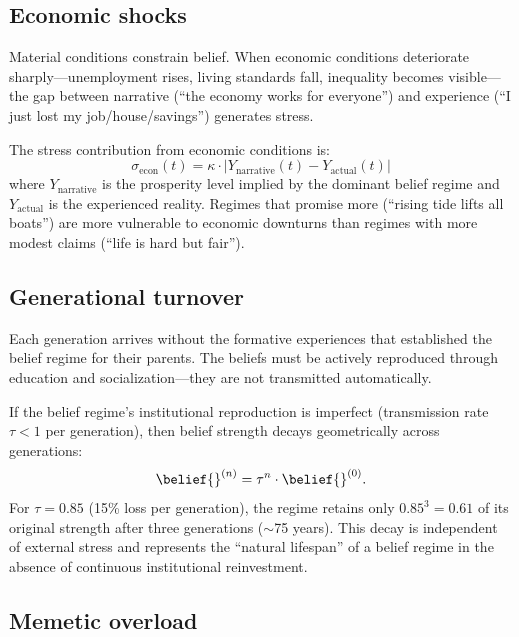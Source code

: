\subsection{Economic shocks}

Material conditions constrain belief.
When economic conditions deteriorate sharply---unemployment rises, living standards fall, inequality becomes visible---the gap between narrative (``the economy works for everyone'') and experience (``I just lost my job/house/savings'') generates stress.

\begin{proposition}
\label{prop:material-narrative-gap}
The stress contribution from economic conditions is:
\[
  \sigma_{\text{econ}}(t) = \kappa \cdot |Y_{\text{narrative}}(t) - Y_{\text{actual}}(t)|
\]
where $Y_{\text{narrative}}$ is the prosperity level implied by the dominant belief regime and $Y_{\text{actual}}$ is the experienced reality.
Regimes that promise more (``rising tide lifts all boats'') are more vulnerable to economic downturns than regimes with more modest claims (``life is hard but fair'').
\end{proposition}

\subsection{Generational turnover}

Each generation arrives without the formative experiences that established the belief regime for their parents.
The beliefs must be actively reproduced through education and socialization---they are not transmitted automatically.

\begin{proposition}
\label{prop:generational-decay}
If the belief regime's institutional reproduction is imperfect (transmission rate $\tau < 1$ per generation), then belief strength decays geometrically across generations:
\[
  \belief{}^{(n)} = \tau^n \cdot \belief{}^{(0)}.
\]
For $\tau = 0.85$ (15\% loss per generation), the regime retains only $0.85^3 = 0.61$ of its original strength after three generations ($\sim$75 years).
This decay is independent of external stress and represents the ``natural lifespan'' of a belief regime in the absence of continuous institutional reinvestment.
\end{proposition}

\subsection{Memetic overload}

